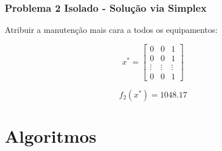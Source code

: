 \documentclass{beamer}
\newcommand{\un}[1]{\;\text{#1}}
\begin{document}
    \begin{frame}
        \frametitle{Problema 2 Isolado - Solução via Simplex}

        \begin{center}
            Atribuir a manutenção mais cara a todos os equipamentos:
        \end{center}

        \[ x^{*} = \begin{bmatrix} 
            0 & 0 & 1 \\
            0 & 0 & 1 \\
            \vdots & \vdots & \vdots \\
            0 &  0      & 1 
            \end{bmatrix} \]

        \vspace{1cm}

       \[ f_2\left(x^{*}\right) = 1048.17 \]
    \end{frame}










\section{Algoritmos}
\end{document}
